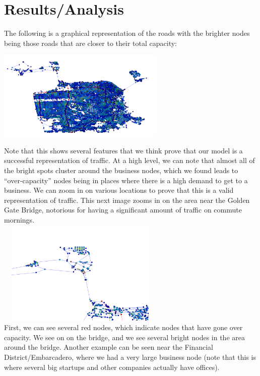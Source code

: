 \documentclass{article}
\begin{document}
\section{Results/Analysis}
The following is a graphical representation of the roads with the brighter nodes being those roads that are closer to their total capacity: \\
\includegraphics[width=8cm,height=5cm]{./figs/f1}\\
Note that this shows several features that we think prove that our model is a successful representation of traffic. At a high level, we can note that almost all of the bright spots cluster around the business nodes, which we found leads to ``over-capacity'' nodes being in places where there is a high demand to get to a business. We can zoom in on various locations to prove that this is a valid representation of traffic. This next image zooms in on the area near the Golden Gate Bridge, notorious for having a significant amount of traffic on commute mornings. \\
 \includegraphics[width=8cm,height=5cm]{./figs/f2} \\
First, we can see several red nodes, which indicate nodes that have gone over capacity. We see on on the bridge, and we see several bright nodes in the area around the bridge. Another example can be seen near the Financial District/Embarcadero, where we had a very large business node (note that this is where several big startups and other companies actually have offices). \\
\end{document}
